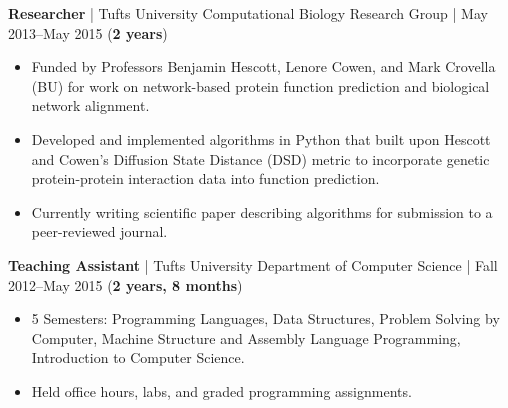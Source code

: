 \documentclass[10pt, letter]{article}
\begin{document}
\vspace{6pt}
{\bf Researcher} | { Tufts University Computational Biology Research Group} | May 2013--May 2015 (\textbf{2 years})\\
\vspace*{-.15in} 
\begin{itemize}[topsep=0pt,itemsep=-1pt]
    \item Funded by Professors Benjamin Hescott, Lenore Cowen, and Mark Crovella (BU) for work on network-based protein function prediction and biological network alignment.
    \item Developed and implemented algorithms in Python that built upon Hescott and Cowen's Diffusion State Distance (DSD) metric to incorporate genetic protein-protein interaction data into function prediction.
    \item Currently writing scientific paper describing algorithms for submission to a peer-reviewed journal.
\end{itemize}
\vspace{6pt}
{\bf Teaching Assistant} | {Tufts University Department of Computer Science} | Fall 2012--May 2015 (\textbf{2 years, 8 months})\\
\vspace*{-.15in}
\begin{itemize}[topsep=0pt,itemsep=-1pt]
  \item 5 Semesters: Programming Languages, Data Structures, Problem Solving by Computer, Machine Structure and Assembly Language Programming, Introduction to Computer Science.
  \item Held office hours, labs, and graded programming assignments.
\end{itemize}
\vspace{3pt}
\end{document}
